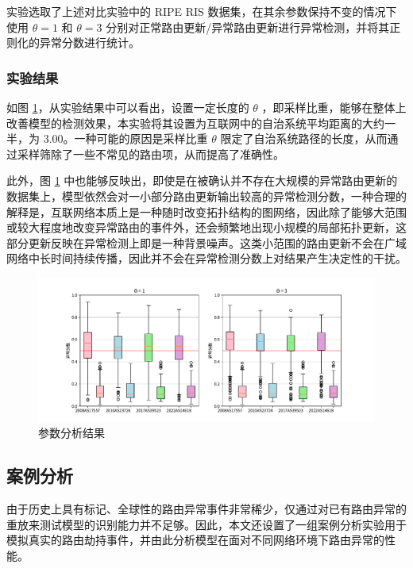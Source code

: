 实验选取了上述对比实验中的 RIPE RIS 数据集，在其余参数保持不变的情况下使用 $\theta = 1$ 和 $\theta = 3$ 分别对正常路由更新/异常路由更新进行异常检测，并将其正则化的异常分数进行统计。

\subsubsection{实验结果}

如图 \ref{c5_arg-analysis}，从实验结果中可以看出，设置一定长度的 $\theta$ ，即采样比重，能够在整体上改善模型的检测效果，本实验将其设置为互联网中的自治系统平均距离的大约一半，为 3.00。一种可能的原因是采样比重 $\theta$ 限定了自治系统路径的长度，从而通过采样筛除了一些不常见的路由项，从而提高了准确性。

此外，图 \ref{c5_arg-analysis} 中也能够反映出，即使是在被确认并不存在大规模的异常路由更新的数据集上，模型依然会对一小部分路由更新输出较高的异常检测分数，一种合理的解释是，互联网络本质上是一种随时改变拓扑结构的图网络，因此除了能够大范围或较大程度地改变异常路由的事件外，还会频繁地出现小规模的局部拓扑更新，这部分更新反映在异常检测上即是一种背景噪声。这类小范围的路由更新不会在广域网络中长时间持续传播，因此并不会在异常检测分数上对结果产生决定性的干扰。

\begin{figure}[h]
    \includegraphics[width=\linewidth]{chapter/c5_images/c5_arg-analysis.pdf}
    \caption{参数分析结果}
    \label{c5_arg-analysis}
\end{figure}


\subsection{案例分析}

由于历史上具有标记、全球性的路由异常事件非常稀少，仅通过对已有路由异常的重放来测试模型的识别能力并不足够。因此，本文还设置了一组案例分析实验用于模拟真实的路由劫持事件，并由此分析模型在面对不同网络环境下路由异常的性能。

